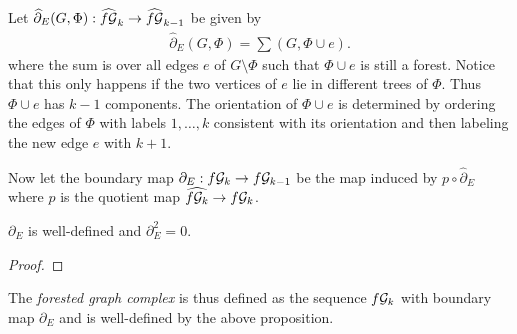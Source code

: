 \begin{definition}
	Let $\widehat{\partial}_E(G,\Phi): \widehat{f\mathcal{G}}_{k} \to \widehat{f\mathcal{G}}_{k-1}$ be given by
\begin{align*}
	\widehat{\partial}_{E}(G,\Phi) = \sum (G, \Phi \cup e)
.\end{align*}
where the sum is over all edges $e$ of $G \setminus \Phi$ such that $\Phi \cup e$ is still a forest.
Notice that this only happens if the two vertices of  $e$ lie in different trees of $\Phi$. Thus $\Phi \cup e$ has $k-1$ components.
The orientation of $\Phi \cup e$ is determined by ordering the edges of $\Phi$ with labels  $1,\ldots,k$ consistent with its orientation
and then labeling the new edge $e$ with  $k+1$.

Now let the boundary map $\partial_{E}: f\mathcal{G}_{k} \to f\mathcal{G}_{k-1}$ be the map induced by $p \circ \widehat{\partial}_{E}$ where $p$ is the quotient map $\widehat{f\mathcal{G}_{k}} \to f\mathcal{G}_{k}$.
\end{definition}

\begin{proposition}
	$\partial_{E}$ is well-defined and $\partial_{E}^2 = 0$.
\end{proposition}

\begin{proof}
	
\end{proof}

The \emph{forested graph complex} is thus defined as the sequence $f\mathcal{G}_{k}$ with boundary map $\partial_{E}$ and is well-defined by the above proposition.


